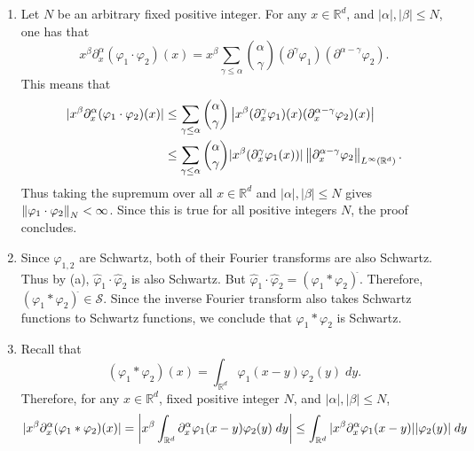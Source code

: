 \documentclass{article}
\begin{document}
\begin{enumerate}[itemsep =-2pt,label = (\alph{*})]
	\item Let $N$ be an arbitrary fixed positive integer. For any $x \in \mathbb{R}^{d}$, and $|\alpha|, |\beta| \leq N$, one has that 
	\begin{equation*}
		x^{\beta}\partial_{x}^{\alpha}(\varphi_{1} \cdot \varphi_{2})(x) = x^{\beta}\sum_{\gamma \leq \alpha}\binom{\alpha}{\gamma}(\partial^{\gamma}\varphi_{1})(\partial^{\alpha - \gamma}\varphi_{2}). 
	\end{equation*}
	This means that 
	\begin{align*}
		\begin{split}
			|x^{\beta}\partial_{x}^{\alpha}(\varphi_{1} \cdot \varphi_{2})(x)| &\leq \sum_{\gamma \leq \alpha}\binom{\alpha}{\gamma}\left| x^{\beta}(\partial_{x}^{\gamma}\varphi_{1})(x)(\partial_{x}^{\alpha - \gamma}\varphi_{2})(x) \right| \\
			&\leq \sum_{\gamma \leq \alpha}\binom{\alpha}{\gamma}|x^{\beta}(\partial_{x}^{\gamma}\varphi_{1}(x))|\left\Vert \partial_{x}^{\alpha - \gamma}\varphi_{2} \right\Vert_{L^{\infty}(\mathbb{R}^{d})}. 
		\end{split} 
	\end{align*}
	Thus taking the supremum over all $x \in \mathbb{R}^{d}$ and $|\alpha|,|\beta| \leq N$ gives $\left\Vert \varphi_{1} \cdot \varphi_{2} \right\Vert_{N} <\infty$. Since this is true for all positive integers $N$, the proof concludes. 
	\item Since $\varphi_{1,2}$ are Schwartz, both of their Fourier transforms are also Schwartz. Thus by (a), $\hat{\varphi}_{1} \cdot \hat{\varphi}_{2}$ is also Schwartz. But $\hat{\varphi}_{1} \cdot \hat{\varphi}_{2} = (\varphi_{1} \ast \varphi_{2})^{\hat{}}$. Therefore, $(\varphi_{1} \ast \varphi_{2})^{\hat{}} \in \mathcal{S}$. Since the inverse Fourier transform also takes Schwartz functions to Schwartz functions, we conclude that $\varphi_{1} \ast \varphi_{2}$ is Schwartz. 
	\item Recall that 
	\begin{equation*}
		(\varphi_{1} \ast \varphi_{2})(x) = \int_{\mathbb{R}^{d}}\varphi_{1}(x - y)\varphi_{2}(y)\;dy. 
	\end{equation*}
	Therefore, for any $x \in \mathbb{R}^{d}$, fixed positive integer $N$, and $|\alpha|,|\beta| \leq N$, 
	\begin{equation*}
		|x^{\beta}\partial_{x}^{\alpha}(\varphi_{1}\ast\varphi_{2})(x)|  = \left| x^{\beta}\int_{\mathbb{R}^{d}}\partial_{x}^{\alpha}\varphi_{1}(x - y)\varphi_{2}(y)\;dy \right| \leq \int_{\mathbb{R}^{d}}|x^{\beta}\partial_{x}^{\alpha}\varphi_{1}(x - y)||\varphi_{2}(y)|\;dy
	\end{equation*} 
\end{enumerate}
\end{document}
